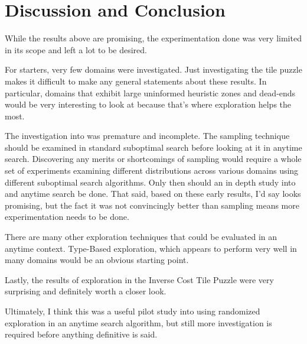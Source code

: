 \section{Discussion and Conclusion}
While the results above are promising, the experimentation done was very limited in its scope and left a lot to be desired. 

For starters, very few domains were investigated. Just investigating the tile puzzle makes it difficult to make any general statements about these results. In particular, domains that exhibit large uninformed heuristic zones and dead-ends would be very interesting to look at because that's where exploration helps the most.

The investigation into \ebawa was premature and incomplete. The \ebgreedy sampling technique should be examined in standard suboptimal search before looking at it in anytime search. Discovering any merits or shortcomings of \ebgreedy sampling would require a whole set of experiments examining different distributions across various domains using different suboptimal search algorithms. Only then should an in depth study into \ebgreedy and anytime search be done. That said, based on these early results, I'd say \ebawa looks promising, but the fact it was not convincingly better than \egreedy sampling means more experimentation needs to be done. 

There are many other exploration techniques that could be evaluated in an anytime context. Type-Based exploration, which appears to perform very well in many domains would be an obvious starting point. 

Lastly, the results of exploration in the Inverse Cost Tile Puzzle were very surprising and definitely worth a closer look.  

Ultimately, I think this was a useful pilot study into using randomized exploration in an anytime search algorithm, but still more investigation is required before anything definitive is said.